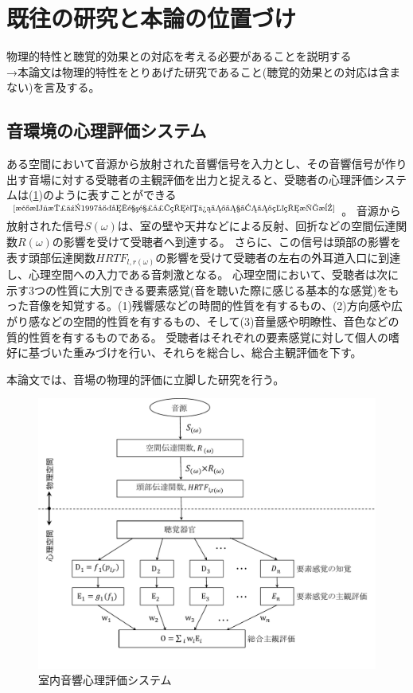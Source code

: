 \newpage
\section{既往の研究と本論の位置づけ}
物理的特性と聴覚的効果との対応を考える必要があることを説明する
\\→本論文は物理的特性をとりあげた研究であること(聴覚的効果との対応は含まない)を言及する。
\subsection{音環境の心理評価システム}
ある空間において音源から放射された音響信号を入力とし、その音響信号が作り出す音場に対する受聴者の主観評価を出力と捉えると、受聴者の心理評価システムは(\ref{fig:室内音響心理評価システム})のように表すことができる$^{\text{\cite{森本政之1997室内音響心理評価のための物理指標}}}$。
音源から放射された信号$S(\omega)$は、室の壁や天井などによる反射、回折などの空間伝達関数$R(\omega)$の影響を受けて受聴者へ到達する。
さらに、この信号は頭部の影響を表す頭部伝達関数$HRTF_{l,r(\omega)}$の影響を受けて受聴者の左右の外耳道入口に到達し、心理空間への入力である音刺激となる。
心理空間において、受聴者は次に示す3つの性質に大別できる要素感覚(音を聴いた際に感じる基本的な感覚)をもった音像を知覚する。(1)残響感などの時間的性質を有するもの、(2)方向感や広がり感などの空間的性質を有するもの、そして(3)音量感や明瞭性、音色などの質的性質を有するものである。
受聴者はそれぞれの要素感覚に対して個人の嗜好に基づいた重みづけを行い、それらを総合し、総合主観評価を下す。

本論文では、音場の物理的評価に立脚した研究を行う。

\begin{figure}[h]
    \centering
    \includegraphics[keepaspectratio,scale=0.5]{01_att/phyco.pdf}
    \caption{\hspace{1mm}室内音響心理評価システム}
    \label{fig:室内音響心理評価システム}
\end{figure}

